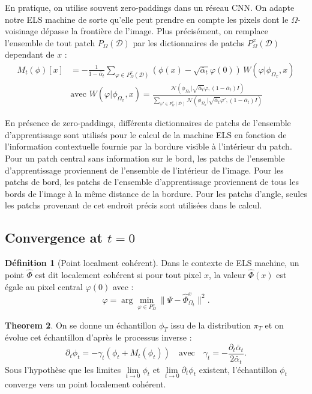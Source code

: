 \documentclass[a4paper,10pt]{article}
\theoremstyle{definition} %
\newtheorem{definition}{Définition}[section]
\theoremstyle{definition} %
\theoremstyle{definition} %
\newtheorem{theorem}[definition]{Theorem}
\theoremstyle{definition} %
\begin{document}
En pratique, on utilise souvent zero-paddings dans un réseau CNN. On adapte notre ELS machine de sorte qu'elle peut prendre en compte les pixels dont le $\Omega$-voisinage dépasse la frontière de l'image. Plus précisément, on remplace l'ensemble de tout patch $P_\Omega(\mathcal{D})$ par les dictionnaires de patchs $P_\Omega^x(\mathcal{D})$ dependant de $x$ :
\begin{align*}
    M_t(\phi)[x] &=  -\frac{1}{1 - \bar \alpha_t}\sum\limits_{\varphi \in P_\Omega^x(\mathcal{D})}  \left(\phi(x) - \sqrt{\bar \alpha_t} \varphi(0)\right)\, W(\varphi | \phi_{\Omega_x},x)\\
    & \text{avec } W(\varphi | \phi_{\Omega_x},x) = \frac{\mathcal{N} (\phi_{\Omega_x} | \sqrt{\bar \alpha_t} \varphi, (1 - \bar \alpha_t) I)}
    {\sum\limits_{\varphi' \in P_\Omega^x(\mathcal{D})} \mathcal{N} (\phi_{\Omega_x} | \sqrt{\bar \alpha_t} \varphi', (1 - \bar \alpha_t) I)}
\end{align*}

En présence de zero-paddings, différents dictionnaires de patchs de l'ensemble d'apprentissage sont utilisés pour le calcul de la machine ELS en fonction de l'information contextuelle fournie par la bordure visible à l'intérieur du patch. Pour un patch central sans information sur le bord, les patchs de l'ensemble d'apprentissage proviennent de l'ensemble de l'intérieur de l'image. Pour les patchs de bord, les patchs de l'ensemble d'apprentissage proviennent de tous les bords de l'image à la même distance de la bordure. Pour les patchs d'angle, seules les patchs provenant de cet endroit précis sont utilisées dans le calcul.

\subsection{Convergence at $t = 0$}
\begin{definition}[Point localment cohérent]
    Dans le contexte de ELS machine, un point \(\hat{\Phi}\) est dit localement cohérent si 
    pour tout pixel \( x \), la valeur \(\hat{\Phi}(x)\) est égale au pixel central \( \varphi(0) \) avec :
\[
    \varphi = \arg \min_{\varphi \in P_{\Omega}^{x}} \|\Psi - \hat{\Phi}_{\Omega_t}^{x}\|^2.
\]
\end{definition}


\begin{theorem}
    On se donne un échantillon \(\phi_T\) issu de la distribution \(\pi_T\) et on évolue cet échantillon d'après le processus inverse :
    \[
    \partial_t \phi_t = - \gamma_t \left( \phi_t + M_t(\phi_t) \right) \quad \text{avec} \quad \gamma_t = -\frac{\partial_t \bar{\alpha}_t}{2 \bar \alpha_t}.
    \]
    Sous l’hypothèse que les limites \( \lim\limits_{t \to 0} \phi_t \) et \( \lim\limits_{t \to 0} \partial_t \phi_t \) existent, l’échantillon \( \phi_t \) converge vers un point localement cohérent.
\end{theorem}
\end{document}
